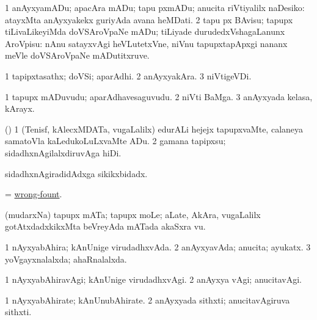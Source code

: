 \bentry
{} 
\gl{\sakirx}
\expl{}
\bmng
\bnum
\num{1} anAyxyamADu; apacAra mADu; tapu pxmADu; anucita riVtiyalilx naDesiko:  atayxMta anAyxyakekx guriyAda avana heMDati. 
\num{2} tapu px BAvisu; tapupx tiLivaLikeyiMda doVSAroVpaNe mADu; tiLiyade durudedxVshagaLanunx AroVpisu:  nAnu satayxvAgi heVLutetxVne, niVnu tapupxtapApxgi nananx meVle doVSAroVpaNe mADutitxruve. 
\enum
\emng
\eentry

\bentry
{} 
\gl{\nA}
\expl{}
\bmng
\bnum
\num{1} tapipxtasathx; doVSi; aparAdhi. 
\num{2} anAyxyakAra. 
\num{3} niVtigeVDi. 
\enum
\emng
\eentry

\bentry
{} 
\gl{\nA}
\expl{}
\bmng
\bnum
\num{1} tapupx mADuvudu; aparAdhavesaguvudu. 
\num{2} niVti BaMga. 
\num{3} anAyxyada kelasa, kArayx. 
\enum
\emng
\eentry

\bentry
{} 
\gl{\sakirx}
\expl{}
\bmng
(\AmA) 
\bnum
\num{1} (Tenisf, kAlecxMDATa, \mo vugaLalilx) edurALi hejejx tapupxvaMte, calaneya samatoVla kaLedukoLuLxvaMte ADu. 
\num{2} gamana tapipxsu; sidadhxnAgilalxdiruvAga hiDi. 
\enum
\emng
\eentry

\bentry
{} 
\gl{\gu}
\expl{}
\bmng
sidadhxnAgiradidAdxga sikikxbidadx. 
\emng
\eentry

\bentry
{} 
\gl{\nA}
\expl{}
\bmng
= \hyperlink{wrong-fount}{wrong-fount}. 
\emng
\eentry

\bentry
{} 
\gl{\nA}
\expl{}
\bmng
(mudarxNa) tapupx mATa; tapupx moLe; aLate, AkAra, \mo vugaLalilx gotAtxdadxkikxMta beVreyAda mATada akaSxra \mo vu. 
\emng
\eentry

\bentry
{} 
\gl{\gu}
\expl{}
\bmng
\bnum
\num{1} nAyxyabAhira; kAnUnige virudadhxvAda. 
\num{2} anAyxyavAda; anucita; ayukatx. 
\num{3} yoVgayxnalalxda; ahaRnalalxda. 
\enum
\emng
\eentry

\bentry
{} 
\gl{\kirxvi}
\expl{}
\bmng
\bnum
\num{1} nAyxyabAhiravAgi; kAnUnige virudadhxvAgi. 
\num{2} anAyxya vAgi; anucitavAgi. 
\enum
\emng
\eentry

\bentry
{} 
\gl{\nA}
\expl{}
\bmng
\bnum
\num{1} nAyxyabAhirate; kAnUnubAhirate. 
\num{2} anAyxyada sithxti; anucitavAgiruva sithxti. 
\enum
\emng
\eentry


